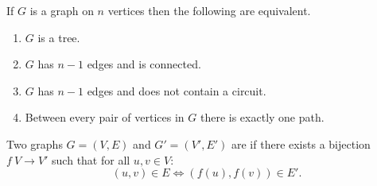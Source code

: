 \begin{theorem}
    If $G$ is a graph on $n$ vertices then the following are equivalent.
    \begin{enumerate}
        \item $G$ is a tree.
        \item $G$ has $n-1$ edges and is connected.
        \item $G$ has $n-1$ edges and does not contain a circuit.
        \item Between every pair of vertices in $G$ there is exactly one path.
    \end{enumerate}
\end{theorem}

\begin{definition}
    Two graphs $G=(V,E)$ and $G'=(V',E')$ are  if there exists a bijection $f \: V \to V'$ such that for all $u,v \in V$:
    \[
        (u,v) \in E \iff (f(u),f(v)) \in E'.
    \]
\end{definition}
